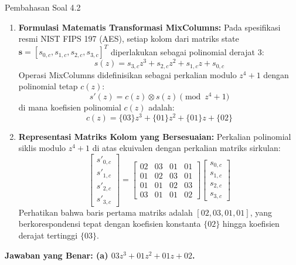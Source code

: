 \documentclass[11pt,a4paper]{article}
\begin{document}
\begin{solusibox}{Pembahasan Soal 4.2}
\begin{enumerate}[leftmargin=*]
    \item \textbf{Formulasi Matematis Transformasi MixColumns:}
    Pada spesifikasi resmi NIST FIPS 197 (AES), setiap kolom dari matriks state $\mathbf{s} = [s_{0,c}, s_{1,c}, s_{2,c}, s_{3,c}]^T$ diperlakukan sebagai polinomial derajat 3:
    \[
    s(z) = s_{3,c} z^3 + s_{2,c} z^2 + s_{1,c} z + s_{0,c}
    \]
    Operasi MixColumns didefinisikan sebagai perkalian modulo $z^4 + 1$ dengan polinomial tetap $c(z)$:
    \[
    s'(z) = c(z) \otimes s(z) \pmod{z^4 + 1}
    \]
    di mana koefisien polinomial $c(z)$ adalah:
    \[
    c(z) = \{03\} z^3 + \{01\} z^2 + \{01\} z + \{02\}
    \]
    \item \textbf{Representasi Matriks Kolom yang Bersesuaian:}
    Perkalian polinomial siklis modulo $z^4 + 1$ di atas ekuivalen dengan perkalian matriks sirkulan:
    \[
    \begin{bmatrix}
    s'_{0,c} \\ s'_{1,c} \\ s'_{2,c} \\ s'_{3,c}
    \end{bmatrix}
    =
    \begin{bmatrix}
    02 & 03 & 01 & 01 \\
    01 & 02 & 03 & 01 \\
    01 & 01 & 02 & 03 \\
    03 & 01 & 01 & 02
    \end{bmatrix}
    \begin{bmatrix}
    s_{0,c} \\ s_{1,c} \\ s_{2,c} \\ s_{3,c}
    \end{bmatrix}
    \]
    Perhatikan bahwa baris pertama matriks adalah $[02, 03, 01, 01]$, yang berkorespondensi tepat dengan koefisien konstanta $\{02\}$ hingga koefisien derajat tertinggi $\{03\}$.
\end{enumerate}
\textbf{Jawaban yang Benar: (a) $03 z^3 + 01 z^2 + 01 z + 02$.}
\end{solusibox}

\vspace{0.4cm}
\end{document}
